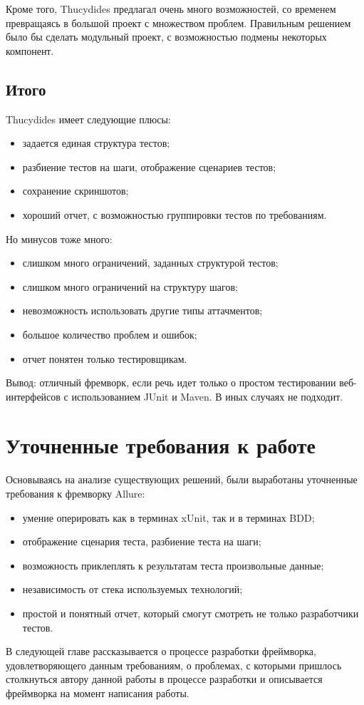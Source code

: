 Кроме того, Thucydides предлагал очень много возможностей, со временем превращаясь в большой проект с множеством проблем. Правильным решением было бы сделать модульный проект, с возможностью подмены некоторых компонент.

\subsection{Итого} 

Thucydides имеет следующие плюсы: 
\begin{itemize}
\item задается единая структура тестов;
\item разбиение тестов на шаги, отображение сценариев тестов;
\item сохранение скриншотов;
\item хороший отчет, с возможностью группировки тестов по требованиям.
\end{itemize}

Но минусов тоже много:
\begin{itemize}
\item слишком много ограничений, заданных структурой тестов;
\item слишком много ограничений на структуру шагов;
\item невозможность использовать другие типы аттачментов;
\item большое количество проблем и ошибок;
\item отчет понятен только тестировщикам.
\end{itemize}

Вывод: отличный фремворк, если речь идет только о простом тестировании веб-интерфейсов с использованием JUnit и Maven. В иных случаях не подходит.

\section{Уточненные требования к работе}

Основываясь на анализе существующих решений, были выработаны уточненные требования к фремворку Allure:

\begin{itemize}
\item умение оперировать как в терминах xUnit, так и в терминах BDD;
\item отображение сценария теста, разбиение теста на шаги;
\item возможность приклеплять к результатам теста произвольные данные;
\item независимость от стека используемых технологий;
\item простой и понятный отчет, который смогут смотреть не только разработчики тестов.
\end{itemize}

В следующей главе рассказывается о процессе разработки фреймворка, удовлетворяющего данным требованиям, о проблемах, с которыми пришлось столкнуться автору данной работы в процессе разработки и описывается фреймворка на момент написания работы.